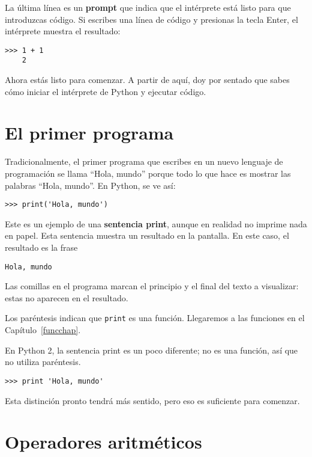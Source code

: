 \documentclass[10pt]{book}
\begin{document}
La última línea es un {\bf prompt} que indica que el intérprete está listo
para que introduzcas código.
Si escribes una línea de código y presionas la tecla Enter, el intérprete
muestra el resultado:

\begin{verbatim}
>>> 1 + 1
    2
\end{verbatim}
%
Ahora estás listo para comenzar.
A partir de aquí, doy por sentado que sabes cómo iniciar el intérprete de Python
y ejecutar código.


\section{El primer programa}
\label{hello}

Tradicionalmente, el primer programa que escribes en un nuevo lenguaje
de programación se llama ``Hola, mundo'' porque todo lo que hace es mostrar
las palabras ``Hola, mundo''.  En Python, se ve así:

\begin{verbatim}
>>> print('Hola, mundo')
\end{verbatim}
%
Este es un ejemplo de una {\bf sentencia print}, aunque
en realidad no imprime nada en papel.  Esta sentencia muestra un resultado en la
pantalla.  En este caso, el resultado es la frase

\begin{verbatim}
Hola, mundo
\end{verbatim}
%
Las comillas en el programa marcan el principio y el final
del texto a visualizar: estas no aparecen en el resultado.

Los paréntesis indican que {\tt print} es una función.  Llegaremos
a las funciones en el Capítulo~\ref{funcchap}.
 

En Python 2, la sentencia print es un poco diferente; no es
una función, así que no utiliza paréntesis.

\begin{verbatim}
>>> print 'Hola, mundo'
\end{verbatim}
%
Esta distinción pronto tendrá más sentido, pero eso es suficiente para
comenzar.


\section{Operadores aritméticos}
\end{document}

